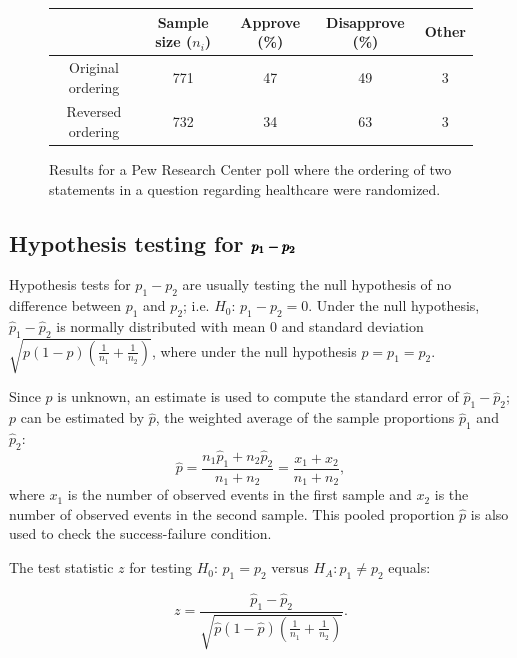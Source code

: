 \begin{figure}[h]
\centering
\begin{tabular}{c c c c c}
	& Sample size ($n_i$) & Approve (\%)	& Disapprove (\%)	& Other \\
\hline
Original ordering & 771	& 47	& 49	& 3 \\
Reversed ordering & 732	& 34	& 63	& 3 \\
\hline
\end{tabular}
\caption{Results for a Pew Research Center poll where the ordering of two statements in a question regarding healthcare were randomized.}
\label{pewPollResultsForRandomizedStatementOrdering}
\end{figure}


\textD{\newpage}


\subsection{Hypothesis testing for $\pmb{\MakeLowercase{p_1 - p_2}}$}


Hypothesis tests for $p_1 - p_2$ are usually testing the null hypothesis of no difference between $p_1$ and $p_2$; i.e. $H_0:\,p_1 - p_2 = 0$. Under the null hypothesis, $\hat{p}_1 - \hat{p}_2$ is normally distributed with mean 0 and standard deviation $\sqrt{p(1-p)(\frac{1}{n_1} + \frac{1}{n_2})}$, where under the null hypothesis $p = p_1 = p_2$.

Since $p$ is unknown, an estimate is used to compute the standard error of $\hat{p}_1 - \hat{p}_2$; $p$ can be estimated by $\hat{p}$, the weighted average of the sample proportions $\hat{p}_1$ and $\hat{p}_2$:
\[\hat{p} = \dfrac{n_{1}\hat{p}_1 + n_{2}\hat{p}_2}{n_{1} + n_{2}} = \dfrac{x_{1} + x_{2}}{n_{1} + n_{2}}, \]
where $x_1$ is the number of observed events in the first sample and $x_2$ is the number of observed events in the second sample. This pooled proportion $\hat{p}$ is also used to check the success-failure condition.

The test statistic $z$ for testing $H_0:\, p_1 = p_2$ versus $H_A: p_1 \neq p_2$ equals:

\[z = \dfrac{\hat{p}_1 - \hat{p}_2}{\sqrt{\hat{p}(1-\hat{p})\left(\frac{1}{n_1} + \frac{1}{n_2} \right)}}. \]


